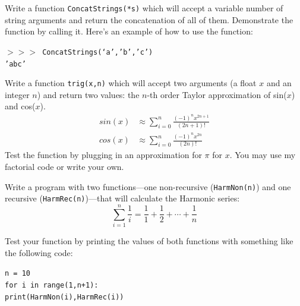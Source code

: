 \documentclass[12pt]{article}%
\newcommand{\code}[1]{\texttt{#1}}
\newcommand{\shp}{$>>>$ }
\newcommand{\tab}{\hspace*{45pt}}
\begin{document}
\begin{Exercise}[origin={10 points, Python}]

Write a function \code{ConcatStrings(*s)} which will accept a variable number of string arguments and return the concatenation of all of them. Demonstrate the function by calling it. Here's an example of how to use the function:

\vspace{10pt}
\code{\shp ConcatStrings(`a','b','c') \\
'abc'
}

\end{Exercise}

\begin{Exercise}[origin={10 points, Python}]

Write a function \code{trig(x,n)} which will accept two arguments (a float $x$ and an integer $n$) and return two values: the $n$-th order Taylor approximation of sin($x$) and cos($x$).
\begin{equation*}
\begin{split}
sin(x) & \approx  \sum_{i = 0}^n \frac{(-1)^n x^{2n+1}}{(2n+1)!} \\
cos(x) & \approx  \sum_{i = 0}^n \frac{(-1)^n x^{2n}}{(2n)!}
\end{split}
\end{equation*}
Test the function by plugging in an approximation for $\pi$ for $x$. You may use my factorial code or write your own.

\end{Exercise}

\begin{Exercise}[origin={20 points, Python}]

Write a program with two functions---one non-recursive (\code{HarmNon(n)}) and one recursive (\code{HarmRec(n)})---that will calculate the Harmonic series:
\begin{equation*}
	\sum_{i=1}^{n} \frac{1}{i} = \frac{1}{1} + \frac{1}{2} + \cdots + \frac{1}{n}
\end{equation*}

Test your function by printing the values of both functions with something like the following code:

\vspace{10pt}
\code{n = 10 \\
for i in range(1,n+1): \\
\tab print(HarmNon(i),HarmRec(i))
}
\end{Exercise}
\end{document}
